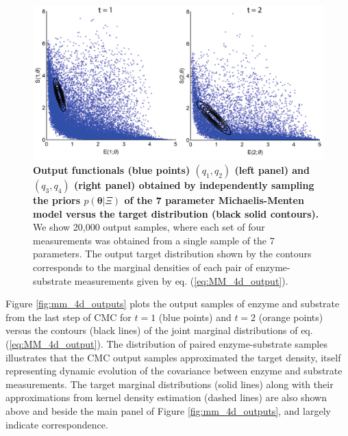 \begin{figure}[H]
\centerline{\includegraphics[width=\textwidth]{../figures/mm_4d_main.pdf}}
\caption{\textbf{Output functionals (blue points) $(q_1,q_2)$ (left panel) and $(q_3,q_4)$ (right panel) obtained by independently sampling the priors $p(\boldsymbol{\theta} | \Xi)$ of the 7 parameter Michaelis-Menten model versus the target distribution (black solid contours).} We show 20,000 output samples, where each set of four measurements was obtained from a single sample of the 7 parameters. The output target distribution shown by the contours corresponds to the marginal densities of each pair of enzyme-substrate measurements given by eq. (\ref{eq:MM_4d_output}).}
\label{fig:mm_4d_main}
\end{figure}

Figure \ref{fig:mm_4d_outputs} plots the output samples of enzyme and substrate from the last step of CMC for $t=1$ (blue points) and $t=2$ (orange points) versus the contours (black lines) of the joint marginal distributions of eq. (\ref{eq:MM_4d_output}). The distribution of paired enzyme-substrate samples illustrates that the CMC output samples approximated the target density, itself representing dynamic evolution of the covariance between enzyme and substrate measurements. The target marginal distributions (solid lines) along with their approximations from kernel density estimation (dashed lines) are also shown above and beside the main panel of Figure \ref{fig:mm_4d_outputs}, and largely indicate correspondence.

